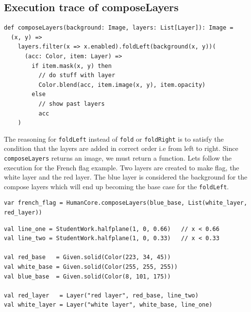 \documentclass[11pt,letterpaper]{article}
\newcommand{\code}[1]{\texttt{#1}}
\begin{document}
\subsection{Execution trace of composeLayers}

\begin{lstlisting}[caption={\code{HumanCore.composeLayers} (human-only)}]
def composeLayers(background: Image, layers: List[Layer]): Image =
  (x, y) =>
    layers.filter(x => x.enabled).foldLeft(background(x, y))(
      (acc: Color, item: Layer) =>
        if item.mask(x, y) then
          // do stuff with layer
          Color.blend(acc, item.image(x, y), item.opacity)
        else
          // show past layers
          acc
    )
\end{lstlisting}

The reasoning for \code{foldLeft} instead of \code{fold} or \code{foldRight} is to satisfy the condition that the layers are added in correct order i.e from left to right. Since \code{composeLayers} returns an image, we must return a function. Lets follow the execution for the French flag example. Two layers are created to make flag, the white layer and the red layer. The blue layer is considered the background for the compose layers which will end up becoming the base case for the \code{foldLeft}.

\begin{lstlisting}[numbers=none,xleftmargin=4pt]
var french_flag = HumanCore.composeLayers(blue_base, List(white_layer, red_layer))
\end{lstlisting}

\begin{lstlisting}[caption={Layers and masks used to build the French flag (\code{Preview.scala})}]
val line_one = StudentWork.halfplane(1, 0, 0.66)   // x < 0.66
val line_two = StudentWork.halfplane(1, 0, 0.33)   // x < 0.33

val red_base   = Given.solid(Color(223, 34, 45))
val white_base = Given.solid(Color(255, 255, 255))
val blue_base  = Given.solid(Color(8, 101, 175))

val red_layer   = Layer("red layer", red_base, line_two)
val white_layer = Layer("white layer", white_base, line_one)
\end{lstlisting}
\end{document}
